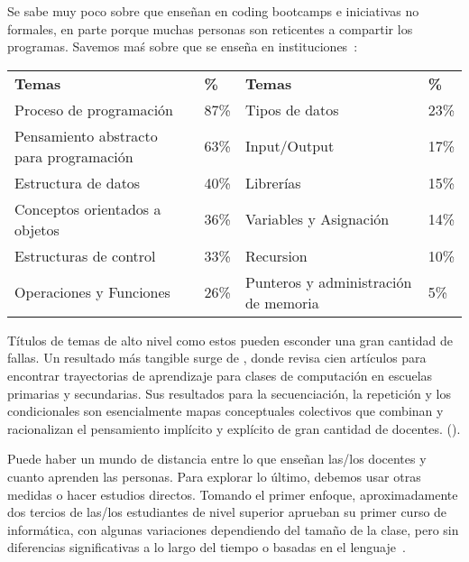 
Se sabe muy poco sobre que enseñan en coding bootcamps e iniciativas no formales, en parte porque muchas personas son reticentes a compartir los programas.
Savemos maś sobre que se enseña en instituciones~\cite{Luxt2017}:

\begin{longtable}{llll}
\textbf{Temas}			& \textbf{\%}	& \textbf{Temas}		& \textbf{\%} \\
Proceso de programación     	& 87\%		& Tipos de datos                & 23\% \\
Pensamiento abstracto para programación	& 63\%		& Input/Output                  & 17\% \\
Estructura de datos      		& 40\%		& Librerías                     & 15\% \\
Conceptos orientados a objetos        & 36\%		& Variables y Asignación       & 14\% \\
Estructuras de control              & 33\%		& Recursion 			& 10\% \\
Operaciones y Funciones         & 26\%		& Punteros y administración de memoria	&  5\%
\end{longtable}

Títulos de temas de alto nivel como estos pueden esconder una gran cantidad de fallas.
Un resultado más tangible surge de \cite{Rich2017},
donde revisa cien artículos para encontrar trayectorias de aprendizaje para clases de computación en escuelas primarias y secundarias.
Sus resultados para la secuenciación, la repetición y los condicionales son esencialmente mapas conceptuales colectivos
que combinan y racionalizan el pensamiento implícito y explícito de gran cantidad de docentes.
().

\newpage



Puede haber un mundo de distancia entre lo que enseñan las/los docentes y cuanto aprenden las personas.
Para explorar lo último, debemos usar otras medidas o hacer estudios directos.
Tomando el primer enfoque, aproximadamente dos tercios de las/los estudiantes de nivel superior aprueban su primer curso de informática,
con algunas variaciones dependiendo del tamaño de la clase,
pero sin diferencias significativas a lo largo del tiempo o basadas en el lenguaje~\cite{Benn2007a,Wats2014}.

